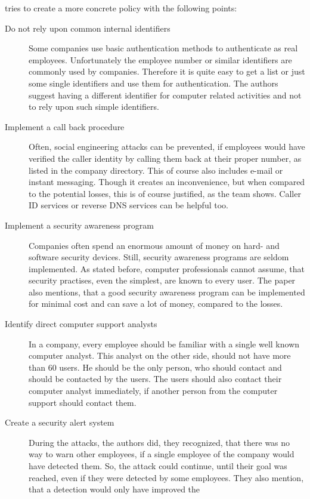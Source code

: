 \cite{winkler1995} tries to create a more concrete policy with the following
points:

\begin{description}
  \item[Do not rely upon common internal identifiers] Some companies use basic
  authentication methods to authenticate as real employees. Unfortunately the
  employee number or similar identifiers are commonly used by companies.
  Therefore it is quite easy to get a list or just some single identifiers and
  use them for authentication. The authors suggest having a different
  identifier for computer related activities and not to rely upon such simple
  identifiers.
  \item[Implement a call back procedure] Often, social engineering attacks can
  be prevented, if employees would have verified the caller identity by calling
  them back at their proper number, as listed in the company directory. This of
  course also includes e-mail or instant messaging. Though it creates an
  inconvenience, but when compared to the potential losses, this is of course
  justified, as the team shows. Caller ID services or reverse DNS services can
  be helpful too.
  \item[Implement a security awareness program] Companies often spend an
  enormous amount of money on hard- and software security devices. Still, security
  awareness programs are seldom implemented. As stated before, computer
  professionals cannot assume, that security practises, even the simplest, are
  known to every user. The paper also mentions, that a good security awareness
  program can be implemented for minimal cost and can save a lot of money,
  compared to the losses.
  \item[Identify direct computer support analysts] In a company, every employee
  should be familiar with a single well known computer analyst. This analyst on
  the other side, should not have more than 60 users. He should be the only
  person, who should contact and should be contacted by the users. The users
  should also contact their computer analyst immediately, if another person
  from the computer support should contact them.
  \item[Create a security alert system] During the attacks, the authors did,
  they recognized, that there was no way to warn other employees, if a single
  employee of the company would have detected them. So, the attack could
  continue, until their goal was reached, even if they were detected by some
  employees. They also mention, that a detection would only have improved the

\end{description}
